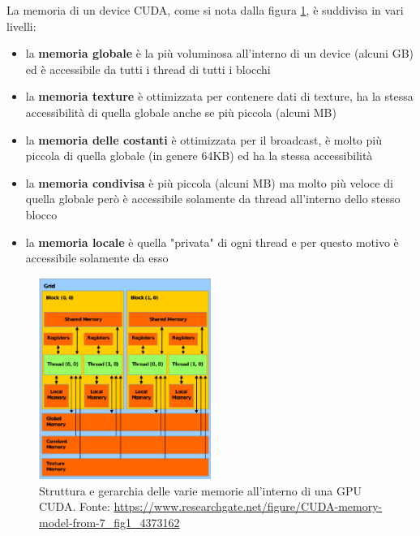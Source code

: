 \documentclass[12pt,a4paper,oneside]{book}
\begin{document}
	La memoria di un device CUDA, come si nota dalla figura \ref{fig:cuda-memory-model}, è suddivisa in vari livelli:
	\begin{itemize}
		\item la \textbf{memoria globale} è la più voluminosa all'interno di un device (alcuni GB) ed è accessibile da tutti i thread di tutti i blocchi
		\item la \textbf{memoria texture} è ottimizzata per contenere dati di texture, ha la stessa accessibilità di quella globale anche se più piccola (alcuni MB)
		\item la \textbf{memoria delle costanti} è ottimizzata per il broadcast, è molto più piccola di quella globale (in genere 64KB) ed ha la stessa accessibilità
		\item la \textbf{memoria condivisa} è più piccola (alcuni MB) ma molto più veloce di quella globale però è accessibile solamente da thread all'interno dello stesso blocco
		\item la \textbf{memoria locale} è quella "privata" di ogni thread e per questo motivo è accessibile solamente da esso
	\end{itemize}
	
	\begin{figure}[!ht]
		\centering
		\includegraphics[width=0.5\textwidth]{CUDA-memory-model}
		\caption[Struttura della memoria di una GPU CUDA]{Struttura e gerarchia delle varie memorie all'interno di una GPU CUDA. Fonte: \url{https://www.researchgate.net/figure/CUDA-memory-model-from-7\_fig1\_4373162}}
		\label{fig:cuda-memory-model}
	\end{figure}
\end{document}
